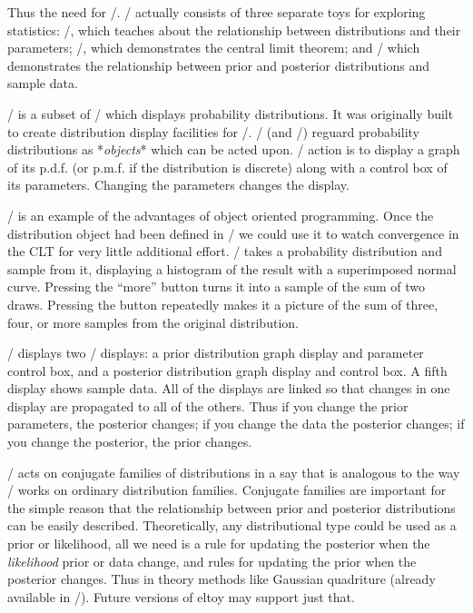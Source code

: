 Thus the need for \eltoy/.  \eltoy/ actually consists of three
separate toys for exploring statistics:  \disttoy/, which teaches
about the relationship between distributions and their parameters;
\clttoy/, which demonstrates the central limit theorem; and \eltoy/
which demonstrates the relationship between prior and posterior
distributions and sample data.

\disttoy/ is a subset of \eltoy/ which displays probability
distributions.  It was originally built to create distribution display
facilities for \eltoy/.  \disttoy/ (and \eltoy/) reguard probability
distributions as *{\it objects\/}* which can be acted upon.  \disttoy/
action is to display a graph of its p.d.f. (or p.m.f. if the
distribution is discrete) along with a control box of its parameters.
Changing the parameters changes the display.

\clttoy/ is an example of the advantages of object oriented
programming.  Once the distribution object had been defined in
\disttoy/ we could use it to watch convergence in the CLT for very
little additional effort.  \clttoy/ takes a probability distribution
and sample from it, displaying a histogram of the result with a
superimposed normal curve.  Pressing the ``more'' button turns it into
a sample of the sum of two draws.  Pressing the button repeatedly
makes it a picture of the sum of three, four, or more samples from the
original distribution.  

\eltoy/ displays two \disttoy/ displays:  a prior distribution graph
display and parameter control box, and a posterior distribution graph
display and control box.  A fifth display shows sample data.  All of
the displays are linked so that changes in one display are propagated
to all of the others.  Thus if you change the prior parameters, the
posterior changes; if you change the data the posterior changes; if
you change the posterior, the prior changes.

\eltoy/ acts on conjugate families of distributions in a say that is
analogous to the way \disttoy/ works on ordinary distribution
families.  Conjugate families are important for the simple reason that
the relationship between prior and posterior distributions can be
easily described.  Theoretically, any distributional type could be
used as a prior or likelihood, all we need is a rule for updating the
posterior when the {\it likelihood\/} prior or data change, and rules
for updating the prior when the posterior changes.  Thus in theory
methods like Gaussian quadriture (already available in \lispstat/).
Future versions of eltoy may support just that.


